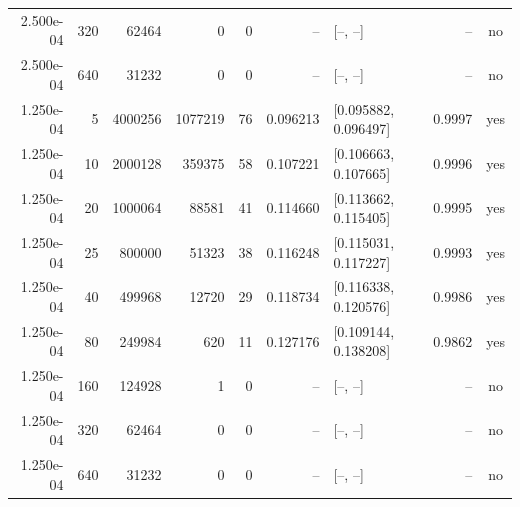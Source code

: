 \documentclass[10pt]{article}
\begin{document}
\begin{longtable}{r r r r r r l r c}
2.500e-04 & 320 & 62464 & 0 & 0 & -- & [--, --] & -- & no \\
2.500e-04 & 640 & 31232 & 0 & 0 & -- & [--, --] & -- & no \\
1.250e-04 & 5 & 4000256 & 1077219 & 76 & 0.096213 & [0.095882, 0.096497] & 0.9997 & yes \\
1.250e-04 & 10 & 2000128 & 359375 & 58 & 0.107221 & [0.106663, 0.107665] & 0.9996 & yes \\
1.250e-04 & 20 & 1000064 & 88581 & 41 & 0.114660 & [0.113662, 0.115405] & 0.9995 & yes \\
1.250e-04 & 25 & 800000 & 51323 & 38 & 0.116248 & [0.115031, 0.117227] & 0.9993 & yes \\
1.250e-04 & 40 & 499968 & 12720 & 29 & 0.118734 & [0.116338, 0.120576] & 0.9986 & yes \\
1.250e-04 & 80 & 249984 & 620 & 11 & 0.127176 & [0.109144, 0.138208] & 0.9862 & yes \\
1.250e-04 & 160 & 124928 & 1 & 0 & -- & [--, --] & -- & no \\
1.250e-04 & 320 & 62464 & 0 & 0 & -- & [--, --] & -- & no \\
1.250e-04 & 640 & 31232 & 0 & 0 & -- & [--, --] & -- & no \\
\bottomrule
\end{longtable}
\normalsize
\end{document}

